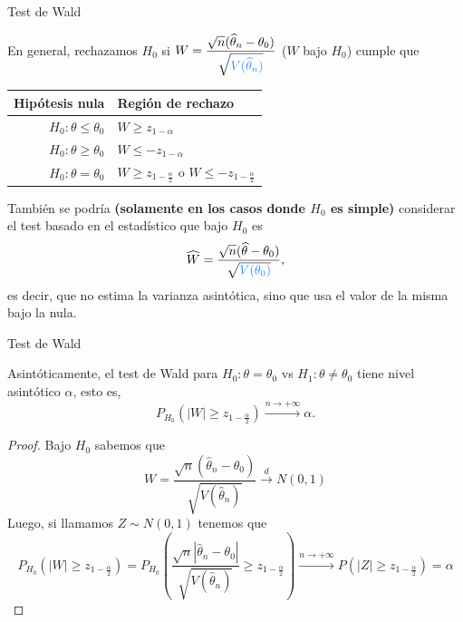 \documentclass{beamer}
\theoremstyle{definition}
\begin{document}
  
\begin{frame}{\color{rosee}Test de Wald}\small
  
En general, 
rechazamos $H_0$ si $W=\dfrac{\sqrt{n}(\widehat{\theta}_n-\theta_0)}{\sqrt{{\color{dodgerblue}V(\widehat{\theta}_n)}}}$ ($W$ bajo $H_0$) cumple que
    \begin{table}
      \begin{tabular}{r|l}
        Hip\'otesis nula & Regi\'on de rechazo \\
        \hline
        $H_0: \theta \leq  \theta_0$ & $W \geq z_{1-\alpha}$ \\
        $H_0: \theta \geq \theta_0$ & $W \leq - z_{1-\alpha}$ \\
        $H_0: \theta =\theta_0$ & $W \geq z_{1-\frac{\alpha}{2}}$ o $W \leq -z_{1-\frac{\alpha}{2}}$\\
      \end{tabular}
    \end{table}  

  
  
 
También se podr\'ia \textbf{(solamente en los casos donde $H_0$ es simple)} considerar el test basado en el estadístico que bajo $H_0$ es
\[\widehat{W}= \dfrac{\sqrt{n}(\widehat{\theta}-\theta_0)}{\sqrt{{\color{dodgerblue}V(\theta_0)}}},\]
  es decir, que no estima la varianza asintótica, sino que usa el valor de la misma bajo la nula. 
  
  
\end{frame}
  
\begin{frame}{\color{rosee}Test de Wald}\small
  \begin{theorem}
    Asint\'oticamente, el test de Wald para $H_0:\theta=\theta_0$ vs $H_1:\theta\neq \theta_0$ tiene nivel asintótico $\alpha$, esto es,
    \[ P_{H_0}(|W|\geq z_{1-\frac{\alpha}{2}}) \xrightarrow{n\to+\infty} \alpha.\]
  \end{theorem}
  \begin{proof}
    Bajo $H_0$ sabemos que
    \[W=\dfrac{\sqrt{n}\left(\widehat{\theta}_n-\theta_0\right)}{\sqrt{{V(\widehat{\theta}_n)}}} \xrightarrow{d} N(0,1)\]
    Luego, si llamamos $Z\sim N(0,1)$ tenemos que
    \[P_{H_0}(|W| \geq z_{1-\frac{\alpha}{2}}) =
      P_{H_0}\left(\frac{\sqrt{n}|\widehat{\theta}_n-\theta_0|}{\sqrt{{V(\widehat{\theta}_n)}}}\geq z_{1-\frac{\alpha}{2}}
      \right ) \xrightarrow{n\to+\infty} P(|Z| \geq z_{1-\frac{\alpha}{2}}) = \alpha\]
  \end{proof}
\end{frame}
\end{document}
